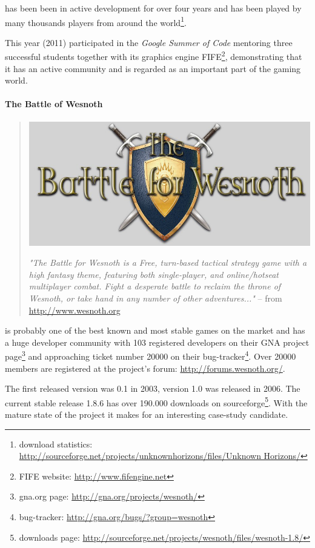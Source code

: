 \UH{} has been been in active development for over four years and has been played by many thousands players from around
the world\footnote{\UH{} download statistics: \url{http://sourceforge.net/projects/unknownhorizons/files/Unknown
Horizons/}}. 

This year (2011) \UH{} participated in the \textit{Google Summer of Code} mentoring three successful students
together with its graphics engine FIFE\footnote{FIFE website: \url{http://www.fifengine.net}}, demonstrating that it has
an active community and is regarded as an important part of the \OS{} gaming world.

\paragraph{The Battle of Wesnoth}
\begin{quote}
\begin{center}\includegraphics[scale=0.4]{pics/wesnothlogo}\end{center}
\textit{"The Battle for Wesnoth is a Free, turn-based tactical strategy game with a high fantasy theme, featuring both
single-player, and online/hotseat multiplayer combat. Fight a desperate battle to reclaim the throne of Wesnoth, or take
hand in any number of other adventures..."} -- from \url{http://www.wesnoth.org}
\end{quote}

\BOW{} is probably one of the best known and most stable \OS{} games on the market and has a huge developer community
with 103 registered developers on their GNA project page\footnote{\BOW{} gna.org page:
\url{http://gna.org/projects/wesnoth/}} and approaching ticket number 20000 on their bug-tracker\footnote{\BOW{}
bug-tracker: \url{http://gna.org/bugs/?group=wesnoth}}. Over 20000 members are registered at the project's forum:
\url{http://forums.wesnoth.org/}.

The first released version was 0.1 in 2003, version 1.0 was released in 2006. The current stable release 1.8.6 has over
190.000 downloads on sourceforge\footnote{\BOW{} downloads page:
\url{http://sourceforge.net/projects/wesnoth/files/wesnoth-1.8/}}. With the mature state of the project it makes for
an interesting case-study candidate.

